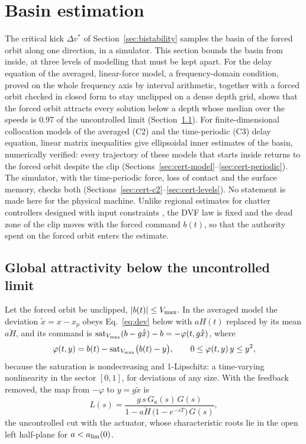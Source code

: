 \section{Basin estimation}\label{sec:certificates}

The critical kick $\Delta v^*$ of Section~\ref{sec:bistability} samples the basin of the forced orbit along one direction, in a simulator. This section bounds the basin from inside, at three levels of modelling that must be kept apart. For the delay equation of the averaged, linear-force model, a frequency-domain condition, proved on the whole frequency axis by interval arithmetic, together with a forced orbit checked in closed form to stay unclipped on a dense depth grid, shows that the forced orbit attracts every solution below a depth whose median over the speeds is 0.97 of the uncontrolled limit (Section~\ref{sec:cert-global}). For finite-dimensional collocation models of the averaged (C2) and the time-periodic (C3) delay equation, linear matrix inequalities give ellipsoidal inner estimates of the basin, numerically verified: every trajectory of these models that starts inside returns to the forced orbit despite the clip (Sections~\ref{sec:cert-model}--\ref{sec:cert-periodic}). The simulator, with the time-periodic force, loss of contact and the surface memory, checks both (Sections~\ref{sec:cert-c2}--\ref{sec:cert-levels}). No statement is made here for the physical machine. Unlike regional estimates for chatter controllers designed with input constraints \citep{zhang2015ellipsoid,wu2016adaptive}, the DVF law is fixed and the dead zone of the clip moves with the forced command $b(t)$, so that the authority spent on the forced orbit enters the estimate.

\subsection{Global attractivity below the uncontrolled limit}\label{sec:cert-global}

Let the forced orbit be unclipped, $\lvert b(t)\rvert\le V_{\max}$. In the averaged model the deviation $\tilde x=x-x_p$ obeys Eq.~\eqref{eq:dev} below with $aH(t)$ replaced by its mean $\overline{aH}$, and its command is $\operatorname{sat}_{V_{\max}}(b-g\dot{\tilde x})-b=-\varphi(t,g\dot{\tilde x})$, where
\begin{equation}\label{eq:phi-sector}
  \varphi(t,y)=b(t)-\operatorname{sat}_{V_{\max}}\bigl(b(t)-y\bigr),\qquad 0\le\varphi(t,y)\,y\le y^2 ,
\end{equation}
because the saturation is nondecreasing and 1-Lipschitz: a time-varying nonlinearity in the sector $[0,1]$, for deviations of any size. With the feedback removed, the map from $-\varphi$ to $y=g\dot{\tilde x}$ is
\begin{equation}\label{eq:Ls}
  L(s)=\frac{g\,s\,G_a(s)\,G(s)}{1-\overline{aH}\,\bigl(1-e^{-sT}\bigr)\,G(s)} ,
\end{equation}
the uncontrolled cut with the actuator, whose characteristic roots lie in the open left half-plane for $a<a_{\lim}(0)$.

